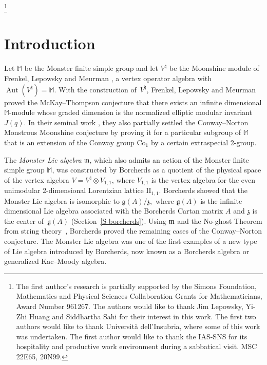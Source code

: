 \documentclass[11pt,letterpaper]{amsart}
\numberwithin{thecounter}{section}
\theoremstyle{definition}
\DeclareMathOperator{\Aut}{Aut}
\newcommand{\m}{{\mathfrak{m}}}
\begin{document}
\thanks{The first author's research is partially supported by the Simons Foundation, Mathematics and Physical Sciences Collaboration Grants for Mathematicians, Award Number 961267.
The authors would like to thank Jim Lepowsky, Yi-Zhi Huang and Siddhartha Sahi for their interest in this work. The first two authors would like to thank Universit\`a dell'Insubria, where some of this work was undertaken. The first author would like to thank the IAS-SNS for its hospitality and productive work environment during a sabbatical visit. MSC 22E65, 20N99.}

\maketitle

\begin{longver}
\tableofcontents
\end{longver}



\section{Introduction}\label{S-intro}
Let $\mathbb{M}$ be the Monster finite simple group and let $V^\natural$ be the Moonshine module  of  Frenkel, Lepowsky and Meurman \cite{FLM}, a  vertex operator algebra with $\Aut(V^\natural)=\mathbb{M}$.    With the construction of~$V^\natural$, Frenkel, Lepowsky and Meurman proved the McKay--Thompson conjecture \cite{Th} that there  exists an infinite dimensional $\mathbb M$-module whose graded dimension is the normalized elliptic modular invariant~$J(q)$.    In their seminal work \cite{FLM}, they also partially settled the Conway--Norton Monstrous Moonshine conjecture \cite{CN} by proving it for  a particular subgroup of $\mathbb M$  that is an extension of the Conway group Co$_1$ by a certain extraspecial 2-group. %

The \emph{Monster Lie algebra} $\m$, which also admits an action of the Monster finite simple group $\mathbb{M}$, was constructed by Borcherds \cite{BoPNAS86} as a  quotient of the physical space  of the vertex algebra $V=V^\natural\otimes V_{{1,1}}$, where  $V_{{1,1}}$ is  the vertex  algebra  for the even unimodular  2-dimensional Lorentzian lattice  $\text{II}_{1,1}$.   Borcherds showed that  the Monster Lie algebra is  isomorphic to $\mathfrak{g}(A)/\mathfrak{z},$ where $\mathfrak g(A)$ is the infinite dimensional Lie algebra associated with  the Borcherds Cartan matrix $A$ and $\mathfrak{z}$ is the center of~$\mathfrak g(A)$ (Section~\ref{S-borcherds}). Using $\frak m$  and the No-ghost Theorem from string theory~\cite{GT}, Borcherds proved the remaining cases of the Conway--Norton  conjecture.  The Monster Lie algebra was one of the first examples of a new type of Lie algebra introduced by Borcherds, now known as a Borcherds algebra or generalized Kac--Moody algebra.
\end{document}
